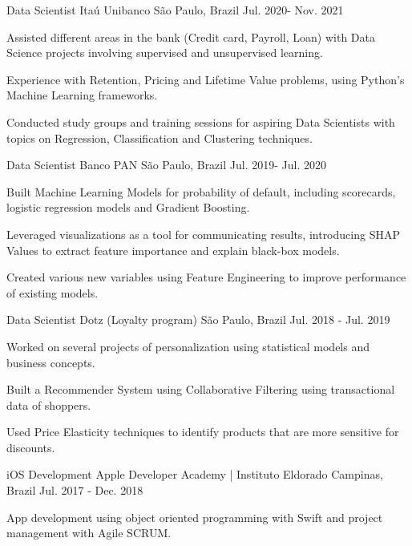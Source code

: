 \begin{cventries}
    \cventry
    {Data Scientist}
    {Itaú Unibanco}
    {São Paulo, Brazil}
    {Jul. 2020- Nov. 2021}
    {
      \begin{cvitems}
        \item {Assisted different areas in the bank (Credit card, Payroll, Loan) with Data Science projects involving supervised and unsupervised learning. }
        \item {Experience with Retention, Pricing and Lifetime Value problems, using Python's Machine Learning frameworks. }
        \item {Conducted study groups and training sessions for aspiring Data Scientists with topics on Regression, Classification and Clustering techniques. }
      \end{cvitems}
    }

    \cventry
    {Data Scientist}
    {Banco PAN}
    {São Paulo, Brazil}
    {Jul. 2019- Jul. 2020}
    {
      \begin{cvitems}
        \item {Built Machine Learning Models for probability of default, including scorecards, logistic regression models and Gradient Boosting. }
        \item {Leveraged visualizations as a tool for communicating results, introducing SHAP Values to extract feature importance and explain black-box models. }
        \item {Created various new variables using Feature Engineering to improve performance of existing models. }
      \end{cvitems}
    }

    \cventry
    {Data Scientist}
    {Dotz (Loyalty program)}
    {São Paulo, Brazil}
    {Jul. 2018 - Jul. 2019}
    {
      \begin{cvitems}
        \item {Worked on several projects of personalization using statistical models and business concepts.}
        \item {Built a Recommender System using Collaborative Filtering using transactional data of shoppers.}
        \item {Used Price Elasticity techniques to identify products that are more sensitive for discounts.}
      \end{cvitems}
    }

    \cventry
    {iOS Development}
    {Apple Developer Academy | Instituto Eldorado}
    {Campinas, Brazil}
    {Jul. 2017 - Dec. 2018}
    {
      \begin{cvitems}
        \item {App development using object oriented programming with Swift and project management with Agile SCRUM.}
      \end{cvitems}
    }


\end{cventries}
